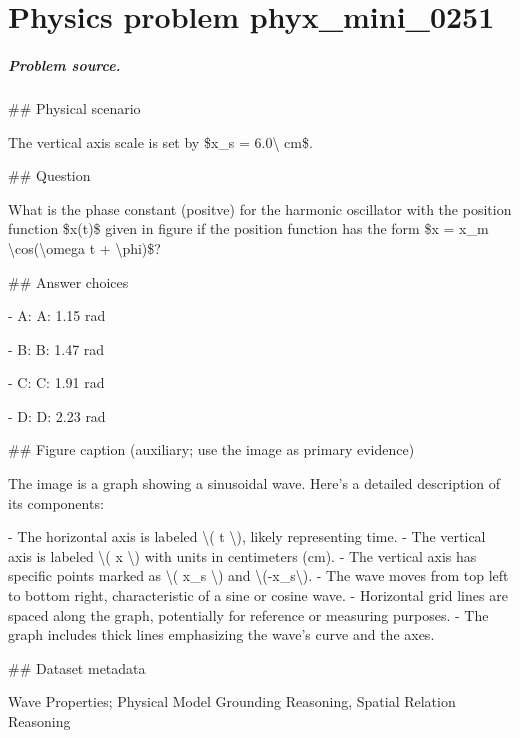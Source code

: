 
\chapter{Physics problem phyx\_mini\_0251}
\label{ch:PhyXMiniProblems_problem_phyx_mini_0251}

\paragraph{Problem source.}
\#\# Physical scenario

The vertical axis scale is set by \$x\_s = 6.0\textbackslash{} cm\$.

\#\# Question

What is the phase constant (positve) for the harmonic oscillator with the position function \$x(t)\$ given in figure if the position function has the form \$x = x\_m \textbackslash{}cos(\textbackslash{}omega t + \textbackslash{}phi)\$?

\#\# Answer choices

- A: A: 1.15 rad

- B: B: 1.47 rad

- C: C: 1.91 rad

- D: D: 2.23 rad

\#\# Figure caption (auxiliary; use the image as primary evidence)

The image is a graph showing a sinusoidal wave. Here's a detailed description of its components:

- The horizontal axis is labeled \textbackslash{}( t \textbackslash{}), likely representing time.
- The vertical axis is labeled \textbackslash{}( x \textbackslash{}) with units in centimeters (cm).
- The vertical axis has specific points marked as \textbackslash{}( x\_s \textbackslash{}) and \textbackslash{}(-x\_s\textbackslash{}).
- The wave moves from top left to bottom right, characteristic of a sine or cosine wave.
- Horizontal grid lines are spaced along the graph, potentially for reference or measuring purposes.
- The graph includes thick lines emphasizing the wave's curve and the axes.

\#\# Dataset metadata

Wave Properties; Physical Model Grounding Reasoning, Spatial Relation Reasoning

